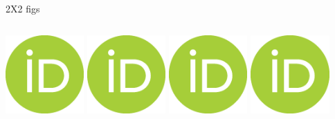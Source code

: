 \documentclass{beamer}
\begin{document}
\begin{frame}{2X2 figs}
    \begin{columns}[t]
        \includegraphics[width=\columnwidth,height=3cm]{figs/ORCIDiD_icon.png}
        \includegraphics[width=\columnwidth,height=3cm]{figs/ORCIDiD_icon.png}
        \includegraphics[width=\columnwidth,height=3cm]{figs/ORCIDiD_icon.png}
        \includegraphics[width=\columnwidth,height=3cm]{figs/ORCIDiD_icon.png}
    \end{columns}
\end{frame}

\end{document}
